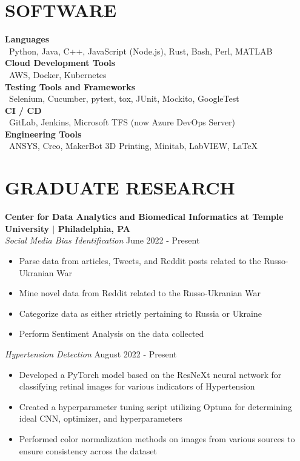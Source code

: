\documentclass[line,resmargin]{res}
\begin{document}
\begin{resume}
\section{SOFTWARE}
\textbf{Languages} \\
\textbullet\ Python, Java, C++, JavaScript (Node.js), Rust, Bash, Perl, MATLAB  \\
\textbf{Cloud Development Tools} \\
\textbullet\ AWS, Docker, Kubernetes \\
\textbf{Testing Tools and Frameworks} \\
\textbullet\ Selenium, Cucumber, pytest, tox, JUnit, Mockito, GoogleTest \\
\textbf{CI / CD} \\
\textbullet\ GitLab, Jenkins, Microsoft TFS (now Azure DevOps Server) \\
\textbf{Engineering Tools} \\
\textbullet\ ANSYS, Creo, MakerBot 3D Printing, Minitab, LabVIEW, \LaTeX        
 
\section{GRADUATE RESEARCH}

\textbf{Center for Data Analytics and Biomedical Informatics at Temple University $|$ Philadelphia, PA} \\
{\sl Social Media Bias Identification} \hfill June 2022 - Present
\begin{itemize} \itemsep -2pt %
	\item Parse data from articles, Tweets, and Reddit posts related to the Russo-Ukranian War
	\item Mine novel data from Reddit related to the Russo-Ukranian War
	\item Categorize data as either strictly pertaining to Russia or Ukraine
	\item Perform Sentiment Analysis on the data collected
\end{itemize}
{\sl Hypertension Detection} \hfill August 2022 - Present
\begin{itemize} \itemsep -2pt %
	\item Developed a PyTorch model based on the ResNeXt neural network for classifying retinal images for various indicators of Hypertension
	\item Created a hyperparameter tuning script utilizing Optuna for determining ideal CNN, optimizer, and hyperparameters
	\item Performed color normalization methods on images from various sources to ensure consistency across the dataset
\end{itemize}
 

\end{resume}
\end{document}
